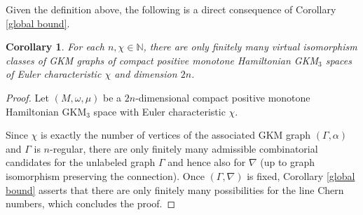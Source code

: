 \documentclass[12pt,a4paper]{amsart}
\newcommand{\NN}{\mathbb{N}}
\newtheorem{cor}[thm]{Corollary}
\theoremstyle{plain}
\theoremstyle{definition}
\begin{document}
Given the definition above, the following is a direct consequence of Corollary \ref{global bound}.
\begin{cor}\label{cor: main}
For each $n, \chi\in \NN$,
there are only finitely many virtual isomorphism classes of GKM graphs of compact positive monotone Hamiltonian GKM$_3$ spaces  of Euler characteristic $\chi$ and dimension $2n$.
\end{cor}

\begin{proof}
Let $(M,\omega,\mu)$ be a $2n$-dimensional compact positive monotone Hamiltonian GKM$_3$ space with Euler characteristic $\chi$. 

Since $\chi$ is exactly the number of vertices of the associated GKM graph $(\Gamma,\alpha)$ and $\Gamma$ is $n$-regular, there are only finitely many admissible 
combinatorial candidates for the unlabeled graph $\Gamma$ and hence also for $\nabla$ (up to graph isomorphism preserving the connection). 
Once $(\Gamma,\nabla)$ is fixed, Corollary \ref{global bound} asserts that there are only finitely many possibilities for the line Chern numbers, which concludes the proof. 
\end{proof}
\end{document}
